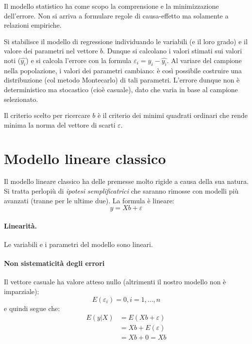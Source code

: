 \documentclass[11pt, twocolumn]{article}
\begin{document}
Il modello statistico ha come scopo la comprensione e la minimizzazione dell'errore.
Non si arriva a formulare regole di causa-effetto ma solamente a relazioni empiriche.

Si stabilisce il modello di regressione individuando le variabili (e il loro grado) e il valore dei parametri nel vettore $b$.
Dunque si calcolano i valori stimati sui valori noti ($\hat{y_i}$) e si calcola l'errore con la formula $\varepsilon_i = y_i - \hat{y_i}$.
Al variare del campione nella popolazione, i valori dei parametri cambiano: è così possibile costruire una distribuzione (col metodo Montecarlo) di tali parametri.
L'errore dunque non è deterministico ma stocastico (cioè casuale), dato che varia in base al campione selezionato.

Il criterio scelto per ricercare $b$ è il criterio dei minimi quadrati ordinari che rende minima la norma del vettore di scarti $\varepsilon$.


\newpage
\part{Modello lineare classico}
Il modello lineare classico ha delle premesse molto rigide a causa della sua natura.
Si tratta perlopiù di \textit{ipotesi semplificatrici} che saranno rimosse con modelli più avanzati (tranne per le ultime due).
La formula è lineare:
\begin{equation*}
  y = Xb + \varepsilon
\end{equation*}

\subsection*{Linearità.}
Le variabili e i parametri del modello sono lineari.

\subsection*{Non sistematicità degli errori}
Il vettore casuale ha valore atteso nullo (altrimenti il nostro modello non è imparziale):
\begin{equation*}
  E(\varepsilon_i)=0, i = 1,\hdots,n 
\end{equation*}
e quindi segue che:
\begin{align*}
  E(y | X) &= E(Xb + \varepsilon) \\
           &= Xb + E(\varepsilon) \\
           &= Xb + 0 = Xb
\end{align*}
\end{document}
